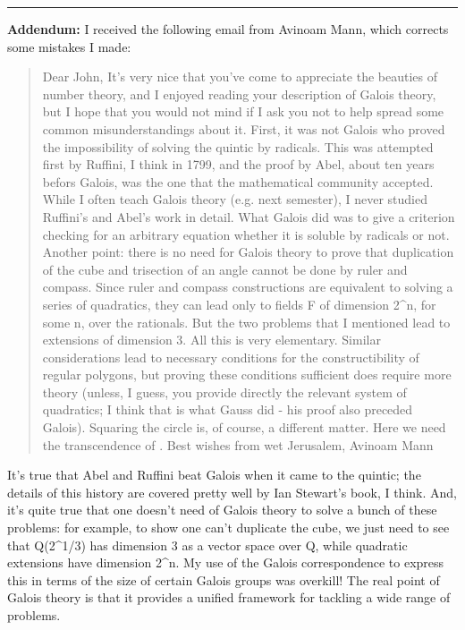 \par\noindent\rule{\textwidth}{0.4pt}
\textbf{Addendum:} I received the following email from Avinoam Mann,
which corrects some mistakes I made:

\begin{quote}
Dear John,
It's very nice that you've come to appreciate the beauties of number
theory, and I enjoyed reading your description of Galois theory, but
I hope that you would not mind if I ask you not to help spread some common
misunderstandings about it. First, it was not Galois who proved the
impossibility of solving the quintic by radicals. This was attempted
first by Ruffini, I think in 1799, and the proof by Abel, about ten years
befors Galois, was the one that the mathematical community accepted.
While I often teach Galois theory (e.g. next semester), I never studied
Ruffini's and Abel's work in detail. What Galois did was to give a
criterion checking for an arbitrary equation whether it is soluble by
radicals or not.
Another point: there is no need for Galois theory to prove that
duplication of the cube and trisection of an angle cannot be done by
ruler and compass. Since ruler and compass constructions are equivalent
to solving a series of quadratics, they can lead only to fields F of
dimension 2^{n}, for some n, over the rationals. But 
the two problems that
I mentioned lead to extensions of dimension 3. All this is very
elementary. Similar considerations lead to necessary conditions for the
constructibility of regular polygons, but proving these conditions
sufficient does require more theory (unless, I guess, you provide
directly the relevant system of quadratics; I think that is what Gauss
did - his proof also preceded Galois). Squaring the circle is, of course,
a different matter. Here we need the transcendence of \pi .
Best wishes from wet Jerusalem,
Avinoam Mann
\end{quote}

It's true that Abel and Ruffini beat Galois when it came to the quintic; 
the details of this history are covered pretty well by Ian Stewart's book, 
I think.
And, it's quite true that one doesn't need of Galois theory to solve
a bunch of these problems: for example, to show one can't duplicate
the cube, we just need to see that Q(2^{1/3}) has dimension 3
as a vector space over Q, while quadratic extensions have dimension 
2^{n}.   My use of the Galois correspondence to express this in
terms of the size of certain Galois groups was overkill!  The real point of
Galois theory is that it provides a unified framework for tackling a wide
range of problems.  


